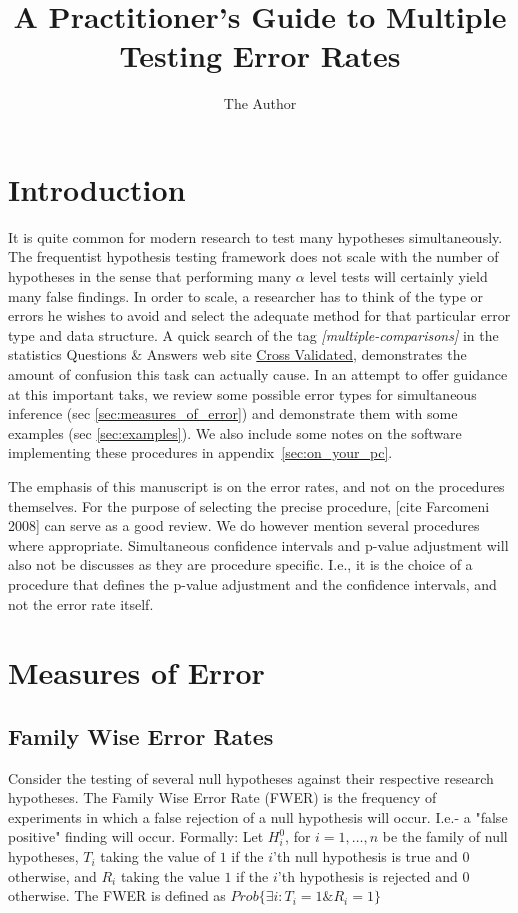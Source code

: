 \documentclass[draft,12pt]{article}
\title{A Practitioner's Guide to Multiple Testing Error Rates}
\author{The Author}
\date{}
\begin{document}
\maketitle


\section{Introduction}

It is quite common for modern research to test many hypotheses simultaneously. The frequentist hypothesis testing framework does not scale with the number of hypotheses in the sense that performing many $\alpha$ level tests will certainly yield many false findings. In order to scale, a researcher has to think of the type or errors he wishes to avoid and select the adequate method for that particular error type and data structure. A quick search of the tag \emph{[multiple-comparisons]} in the statistics Questions \& Answers web site \href{http://stats.stackexchange.com}{Cross Validated}, demonstrates the amount of confusion this task can actually cause. In an attempt to offer guidance at this important taks, we review some possible error types for simultaneous inference (sec \ref{sec:measures_of_error}) and demonstrate them with some examples (sec \ref{sec:examples}). We also include some notes on the software implementing these procedures in appendix~\ref{sec:on_your_pc}.

The emphasis of this manuscript is on the error rates, and not on the procedures themselves. For the purpose of selecting the precise procedure, [cite Farcomeni 2008] can serve as a good review. We do however mention several procedures where appropriate.  Simultaneous confidence intervals and p-value adjustment will also not be discusses as they are procedure specific. I.e., it is the choice of a procedure that defines the p-value adjustment and the confidence intervals, and not the error rate itself.


\section{\label{sec:measures_of_error}Measures of Error}

\subsection{Family Wise Error Rates}
Consider the testing of several null hypotheses against their respective research hypotheses. The Family Wise Error Rate (FWER) is the frequency of experiments in which a false rejection of a null hypothesis will occur. I.e.- a "false positive" finding will occur.
Formally: Let $H^0_i$, for $i=1,\ldots,n$ be the family of null hypotheses, $T_i$ taking the value of $1$ if the $i$'th null hypothesis is true and 0 otherwise,  and $R_i$ taking the value $1$ if the $i$'th hypothesis is rejected and 0 otherwise.
The FWER is defined as $Prob\{\exists i:T_i=1 \& R_i=1  \}$
\end{document}
